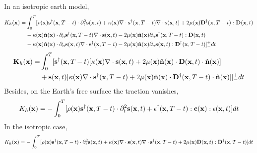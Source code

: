 In an isotropic earth model,
\begin{align*}
  K_h(\mathbf{x})= & \int_0^T[\rho(\mathbf{x})\mathbf{s}^\dagger(\mathbf{x},T-t)\cdot\partial_t^2\mathbf{s}(\mathbf{x},t)+\kappa(\mathbf{x})\nabla\cdot\mathbf{s}^\dagger(\mathbf{x},T-t)\nabla\cdot\mathbf{s}(\mathbf{x},t)+2\mu(\mathbf{x})\mathbf{D}^\dagger(\mathbf{x},T-t):\mathbf{D}(\mathbf{x},t) \\
    & -\kappa(\mathbf{x})\hat{\mathbf{n}}(\mathbf{x})\cdot\partial_n\mathbf{s}^\dagger(\mathbf{x},T-t)\nabla\cdot\mathbf{s}(\mathbf{x},t)-2\mu(\mathbf{x})\hat{\mathbf{n}}(\mathbf{x})\partial_n\mathbf{s}^\dagger(\mathbf{x},T-t):\mathbf{D}(\mathbf{x},t) \\
	& -\kappa(\mathbf{x})\hat{\mathbf{n}}(\mathbf{x})\cdot\partial_n\mathbf{s}(\mathbf{x},t)\nabla\cdot\mathbf{s}^\dagger(\mathbf{x},T-t)-2\mu(\mathbf{x})\hat{\mathbf{n}}(\mathbf{x})\partial_n\mathbf{s}(\mathbf{x},t):\mathbf{D}^\dagger(\mathbf{x},T-t)]_-^+dt
\end{align*}
\begin{align*}
  \mathbf{K}_h(\mathbf{x})= & \int_0^T[\mathbf{s}^\dagger(\mathbf{x},T-t)[\kappa(\mathbf{x})\nabla\cdot\mathbf{s}(\mathbf{x},t)+2\mu(\mathbf{x})\hat{\mathbf{n}}(\mathbf{x})\cdot\mathbf{D}(\mathbf{x},t)\cdot\hat{\mathbf{n}}(\mathbf{x})] \\
    & +\mathbf{s}(\mathbf{x},t)[\kappa(\mathbf{x})\nabla\cdot\mathbf{s}^\dagger(\mathbf{x},T-t)+2\mu(\mathbf{x})\hat{\mathbf{n}}(\mathbf{x})\cdot\mathbf{D}^\dagger(\mathbf{x},T-t)\cdot\hat{\mathbf{n}}(\mathbf{x})]]_-^+dt
\end{align*}
Besides, on the Earth's free surface the traction vanishes,
\[ K_h(\mathbf{x})=-\int_0^T[\rho(\mathbf{x})\mathbf{s}^\dagger(\mathbf{x},T-t)\cdot\partial_t^2\mathbf{s}(\mathbf{x},t)+\mathbf{\epsilon}^\dagger(\mathbf{x},T-t):\mathbf{c}(\mathbf{x}):\mathbf{\epsilon}(\mathbf{x},t)]dt \]
In the isotropic case,
\[ K_h(\mathbf{x})=-\int_0^T[\rho(\mathbf{x})\mathbf{s}^\dagger(\mathbf{x},T-t)\cdot\partial_t^2\mathbf{s}(\mathbf{x},t)+\kappa(\mathbf{x})\nabla\cdot\mathbf{s}(\mathbf{x},t)\nabla\cdot\mathbf{s}^\dagger(\mathbf{x},T-t)+2\mu(\mathbf{x})\mathbf{D}(\mathbf{x},t):\mathbf{D}^\dagger(\mathbf{x},T-t)]dt \]\par
